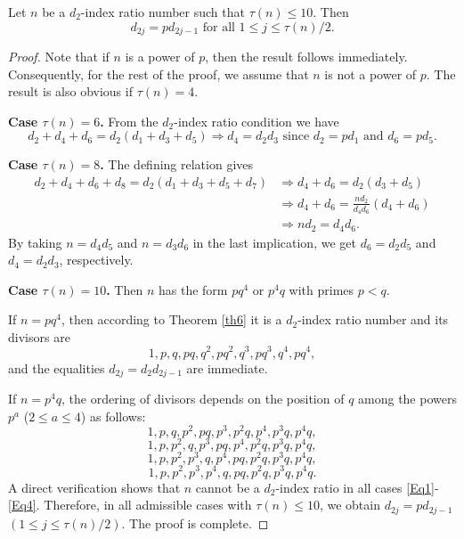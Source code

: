 \documentclass[12pt,reqno]{article}
\begin{document}
\begin{theorem}\label{th9}
Let \( n \) be a \( d_2 \)-index ratio number such that \( \tau(n) \leq 10 \). Then
\begin{equation}\label{eq2}
d_{2j} = p d_{2j-1} \text{ for all } 1 \leq j \leq \tau(n)/2.
\end{equation}
\end{theorem}

\begin{proof}
Note that if \( n \) is a power of \( p \), then the result follows immediately. Consequently, for the rest of the proof, we assume that \( n \) is not a power of \( p \). The result is also obvious if \( \tau(n) = 4 \).

\medskip
\noindent
\textbf{Case \( \tau(n)=6 \).}
From the \( d_2 \)-index ratio condition we have
$$
d_2 + d_4 + d_6 = d_2(d_1 + d_3 + d_5) \Rightarrow d_4 = d_2 d_3 \text{ since } d_2 = p d_1 \text{ and } d_6 = p d_5.
$$

\medskip
\noindent
\textbf{Case \( \tau(n)=8 \).}
The defining relation gives
\begin{align*}
d_2 + d_4 + d_6 + d_8 = d_2(d_1 + d_3 + d_5 + d_7) &\Rightarrow d_4 + d_6 = d_2(d_3 + d_5) \\
&\Rightarrow d_4 + d_6 =  \frac{nd_2}{d_4 d_6}(d_4 + d_6) \\
&\Rightarrow nd_2 = d_4 d_6.
\end{align*}
By taking \( n = d_4 d_5 \) and \( n = d_3 d_6 \) in the last implication, we get \( d_6 = d_2 d_5 \) and \( d_4 = d_2 d_3 \), respectively.

\medskip
\noindent
\textbf{Case \( \tau(n)=10 \).}
Then \( n \) has the form \( p q^4 \) or \( p^4 q \) with primes \( p<q \).

If \( n=pq^4 \), then according to Theorem \ref{th6} it is a $d_2$-index ratio number and its divisors are
\[
1,p,q,pq,q^2,pq^2,q^3,pq^3,q^4,pq^4,
\]
and the equalities \( d_{2j}=d_2 d_{2j-1} \) are immediate.

If \( n=p^4 q \), the ordering of divisors depends on the position of 
\( q \) among the powers \( p^a \) (\(2\le a\le 4\)) as follows:
\begin{equation}\label{Eq1}
1,p,q,p^2,pq,p^3,p^2q,p^4,p^3q,p^4q,
\end{equation}
\begin{equation}\label{Eq2}
1,p,p^2,q,p^3,pq,p^4,p^2q,p^3q,p^4q,
\end{equation}
\begin{equation}\label{Eq3}
1,p,p^2,p^3,q,p^4,pq,p^2q,p^3q,p^4q,
\end{equation}
\begin{equation}\label{Eq4}
1,p,p^2,p^3,p^4,q,pq,p^2q,p^3q,p^4q.
\end{equation} 
A direct verification shows that $n$ cannot be a $d_2$-index ratio in all cases \eqref{Eq1}-\eqref{Eq4}. 
Therefore, in all admissible cases with \( \tau(n)\le 10 \), we obtain
$d_{2j}=p d_{2j-1}$ $(1\le j\le \tau(n)/2)$. The proof is complete.
\end{proof}
\end{document}
